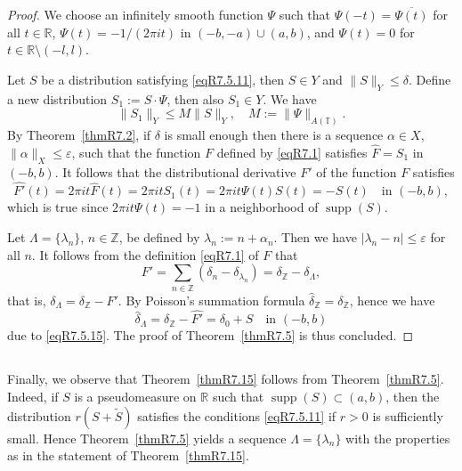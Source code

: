 \documentclass[reqno,a4paper,12pt]{amsart}
\numberwithin{equation}{section}
\numberwithin{figure}{section}
\newcommand\R{\mathbb{R}}
\newcommand\Z{\mathbb{Z}}
\newcommand\T{\mathbb{T}}
\newcommand\lam{\lambda}
\newcommand\Lam{\Lambda}
\newcommand\1{\mathds{1}}
\newcommand\eps{\varepsilon}
\renewcommand\leq{\leqslant}
\newcommand\sbt{\subset}
\renewcommand\hat{\widehat}
\newcommand{\ft}[1]{\widehat{#1}}
\newcommand{\supp}{\operatorname{supp}}
\theoremstyle{plain}
\newcommand{\thmref}[1]{Theorem~\ref{#1}}
\theoremstyle{definition}
\begin{document}
\begin{proof}
We choose  an infinitely smooth function  $\Psi$ 
such that $\Psi(-t)=\overline{\Psi(t)}$ for all $t \in \R$,
$\Psi(t) = -1/(2\pi i t)$ in $(-b,-a)\cup(a,b)$,
and $\Psi(t)=0$ for $t \in \R \setminus (-l,l)$.

Let $S$ be a distribution satisfying
\eqref{eqR7.5.11}, then $S \in Y$ and 
  $\|S\|_Y \leq \delta$. Define a new
distribution
$S_1 := S \cdot \Psi$, then also  $S_1 \in Y$.
We have
\[
\|S_1\|_Y \leq M \|S\|_Y, \quad 
M := \|\Psi\|_{A(\T)}.
\]
By \thmref{thmR7.2},  if $\delta$ is small 
enough then there is a sequence $\alpha \in X$,
$\|\alpha\|_X \leq \eps$,
such that the function $F$ defined by \eqref{eqR7.1}
satisfies $\hat F= S_1$ in $(-b,b)$.
It follows that the distributional derivative $F'$
 of the function $F$ satisfies
 \begin{equation}
\label{eqR7.5.15}
\ft{F'}(t) = 2 \pi i t \ft{F}(t) =  2 \pi i t S_1(t) = 
 2 \pi i t \Psi(t) S(t) = - S(t)
\quad \text{in $(-b,b)$},
 \end{equation}
which is true since $2 \pi i t \Psi(t) = -1$ in a neighborhood
of $\supp(S)$.


Let 
$\Lam = \{\lam_n\}$, $n\in\Z$,
be defined by
$\lam_n:=n+\alpha_n$.
Then we have
$|\lam_n - n | \leq \eps$ for all $n$.
It follows from the definition  \eqref{eqR7.1}
of  $F$ that
\[
F' = \sum_{n\in\Z}
(\delta_n-\delta_{\lam_n}) = \delta_{\Z} - \delta_\Lambda,
\]
that is, $\delta_\Lam = \delta_{\Z} - F'$. 
By Poisson's summation formula
$\hat \delta_{\Z}=\delta_{\Z}$, hence we have
\[
\hat \delta_\Lambda =\delta_{\Z}-\ft{{F'}}
= \delta_0 + S
\quad \text{in $(-b,b)$}
\]
due to \eqref{eqR7.5.15}. The proof of \thmref{thmR7.5} is thus concluded.
\end{proof}


\subsection{}
Finally, we observe that
 \thmref{thmR7.15} follows
from \thmref{thmR7.5}.
Indeed, if $S$ is a pseudomeasure on $\R$ such that
$\supp(S) \sbt (a,b)$, then
the distribution $r(S + \widetilde{S})$
satisfies the conditions
\eqref{eqR7.5.11} if 
$r>0$ is sufficiently small.
Hence \thmref{thmR7.5} yields
a sequence $\Lam = \{\lam_n\}$
with the properties as in the statement
of  \thmref{thmR7.15}.




\end{document}
